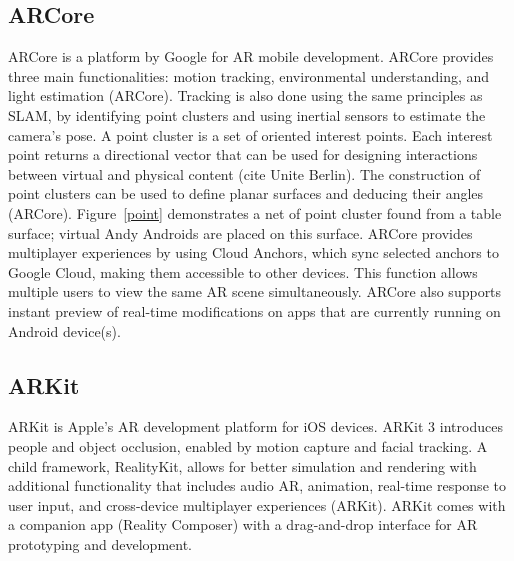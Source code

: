 \subsection{ARCore} 
ARCore is a platform by Google for AR mobile development. ARCore provides three main functionalities: motion tracking, environmental understanding, and light estimation (ARCore). Tracking is also done using the same principles as SLAM, by identifying point clusters and using inertial sensors to estimate the camera’s pose. A point cluster is a set of oriented interest points. Each interest point returns a directional vector that can be used for designing interactions between virtual and physical content (cite Unite Berlin). The construction of point clusters can be used to define planar surfaces and deducing their angles  (ARCore). Figure~\ref{point} demonstrates a net of point cluster found from a table surface; virtual Andy Androids are placed on this surface. ARCore provides multiplayer experiences by using Cloud Anchors, which sync selected anchors to Google Cloud, making them accessible to other devices. This function allows multiple users to view the same AR scene simultaneously. ARCore also supports instant preview of real-time modifications on apps that are currently running on Android device(s).

\begin{figure}[!ht]
\end{figure}

\subsection{ARKit}
ARKit is Apple's AR development platform for iOS devices. ARKit 3 introduces people and object occlusion, enabled by motion capture and facial tracking. A child framework, RealityKit, allows for better simulation and rendering with additional functionality that includes audio AR, animation, real-time response to user input, and cross-device multiplayer experiences (ARKit). ARKit comes with a companion app (Reality Composer) with a drag-and-drop interface for AR prototyping and development.

